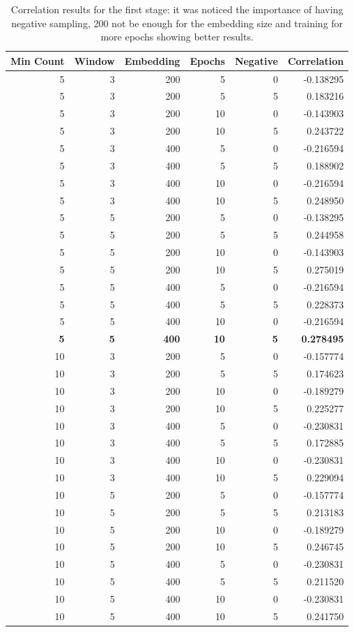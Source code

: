 \documentclass[11pt,oneside,a4paper]{article}
\begin{document}
\begin{table}[]
\centering
\begin{tabular}{@{}rrrrrr@{}}
\toprule
\multicolumn{1}{l}{Min Count} & \multicolumn{1}{l}{Window} & \multicolumn{1}{l}{Embedding} & \multicolumn{1}{l}{Epochs} & \multicolumn{1}{l}{Negative} & \multicolumn{1}{l}{Correlation} \\ \midrule
5 & 3 & 200 & 5 & 0 & -0.138295 \\
5 & 3 & 200 & 5 & 5 & 0.183216 \\
5 & 3 & 200 & 10 & 0 & -0.143903 \\
5 & 3 & 200 & 10 & 5 & 0.243722 \\
5 & 3 & 400 & 5 & 0 & -0.216594 \\
5 & 3 & 400 & 5 & 5 & 0.188902 \\
5 & 3 & 400 & 10 & 0 & -0.216594 \\
5 & 3 & 400 & 10 & 5 & 0.248950 \\
5 & 5 & 200 & 5 & 0 & -0.138295 \\
5 & 5 & 200 & 5 & 5 & 0.244958 \\
5 & 5 & 200 & 10 & 0 & -0.143903 \\
5 & 5 & 200 & 10 & 5 & 0.275019 \\
5 & 5 & 400 & 5 & 0 & -0.216594 \\
5 & 5 & 400 & 5 & 5 & 0.228373 \\
5 & 5 & 400 & 10 & 0 & -0.216594 \\
\textbf{5} & \textbf{5} & \textbf{400} & \textbf{10} & \textbf{5} & \textbf{0.278495} \\
10 & 3 & 200 & 5 & 0 & -0.157774 \\
10 & 3 & 200 & 5 & 5 & 0.174623 \\
10 & 3 & 200 & 10 & 0 & -0.189279 \\
10 & 3 & 200 & 10 & 5 & 0.225277 \\
10 & 3 & 400 & 5 & 0 & -0.230831 \\
10 & 3 & 400 & 5 & 5 & 0.172885 \\
10 & 3 & 400 & 10 & 0 & -0.230831 \\
10 & 3 & 400 & 10 & 5 & 0.229094 \\
10 & 5 & 200 & 5 & 0 & -0.157774 \\
10 & 5 & 200 & 5 & 5 & 0.213183 \\
10 & 5 & 200 & 10 & 0 & -0.189279 \\
10 & 5 & 200 & 10 & 5 & 0.246745 \\
10 & 5 & 400 & 5 & 0 & -0.230831 \\
10 & 5 & 400 & 5 & 5 & 0.211520 \\
10 & 5 & 400 & 10 & 0 & -0.230831 \\
10 & 5 & 400 & 10 & 5 & 0.241750 \\ \bottomrule
\end{tabular}
\caption{Correlation results for the first stage: it was noticed the importance of having negative sampling, 200 not be enough for the embedding size and training for more epochs showing better results.}
\label{tab:first-training}
\end{table}
\end{document}
